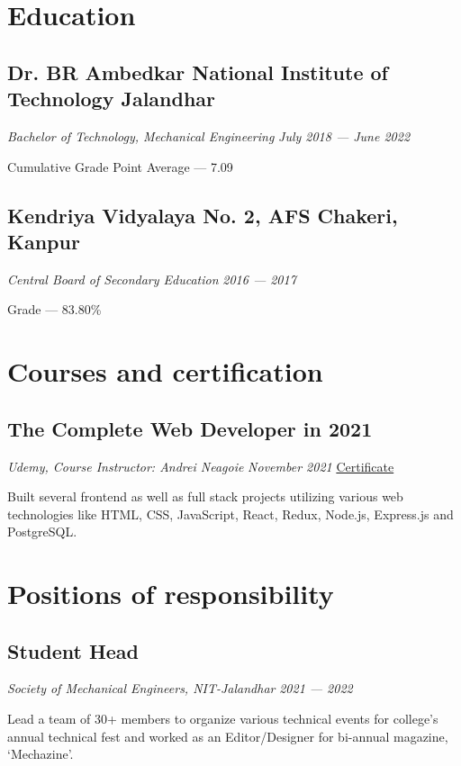 \documentclass[a4paper]{article}
\begin{document}
\section{Education}
\subsection{Dr. BR Ambedkar National Institute of Technology Jalandhar}
\textit{Bachelor of Technology, Mechanical Engineering}
\hfill
\textit{July 2018 --- June 2022}

Cumulative Grade Point Average --- 7.09

\subsection{Kendriya Vidyalaya No. 2, AFS Chakeri, Kanpur}
\textit{Central Board of Secondary Education}
\hfill
\textit{2016 --- 2017}

Grade --- 83.80\%

\section{Courses and certification}
\subsection{The Complete Web Developer in 2021}
\textit{Udemy, Course Instructor: Andrei Neagoie}
\hfill
\textit{November 2021} \textbar \href{https://www.udemy.com/certificate/UC-13ddb4ce-86c8-4396-9cb7-701f5c522fd8/}{  Certificate \faExternalLink}

Built several frontend as well as full stack projects utilizing various web technologies like HTML, CSS, JavaScript, React, Redux, Node.js, Express.js and PostgreSQL.


\section{Positions of responsibility}
\subsection{Student Head}
\textit{Society of Mechanical Engineers, NIT-Jalandhar}
\hfill
\textit{2021 --- 2022}

Lead a team of 30+ members to organize various technical events for college's annual technical fest and worked as an Editor/Designer for bi-annual magazine, `Mechazine'.
\end{document}
